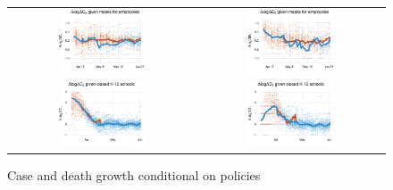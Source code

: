 \documentclass[11pt,reqno,letter]{amsart}
\theoremstyle{definition}
\begin{document}
\begin{figure}
  \caption{Case and death growth conditional on policies \label{fig:growthpolicies1}}
  \begin{minipage}{\linewidth}
    \centering
    \begin{tabular}{cc}
      \includegraphics[width=0.483\textwidth]{tables_and_figures/pmaskbus-cases}
      &
        \includegraphics[width=0.483\textwidth]{tables_and_figures/pmaskbus-deaths}
      \\
      \includegraphics[width=0.483\textwidth]{tables_and_figures/pk12-cases}
      &
        \includegraphics[width=0.483\textwidth]{tables_and_figures/pk12-deaths}

\end{tabular}
\end{minipage}
\end{figure}
\end{document}
